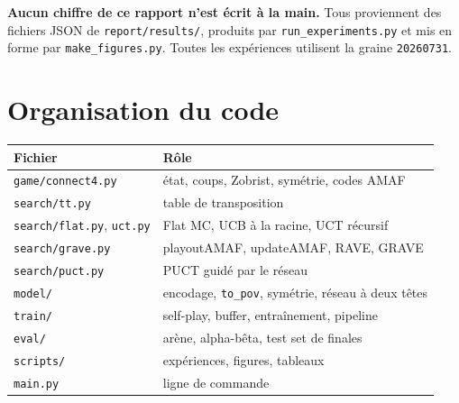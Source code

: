 \documentclass[11pt,a4paper]{article}
\begin{document}
\textbf{Aucun chiffre de ce rapport n'est écrit à la main.} Tous proviennent des
fichiers JSON de \texttt{report/results/}, produits par
\texttt{run\_experiments.py} et mis en forme par \texttt{make\_figures.py}. Toutes
les expériences utilisent la graine \texttt{20260731}.

\section{Organisation du code}

\begin{center}
\footnotesize
\begin{tabular}{@{}ll@{}}
\toprule
Fichier & Rôle \\
\midrule
\texttt{game/connect4.py} & état, coups, Zobrist, symétrie, codes AMAF \\
\texttt{search/tt.py} & table de transposition \\
\texttt{search/flat.py}, \texttt{uct.py} & Flat MC, UCB à la racine, UCT récursif \\
\texttt{search/grave.py} & playoutAMAF, updateAMAF, RAVE, GRAVE \\
\texttt{search/puct.py} & PUCT guidé par le réseau \\
\texttt{model/} & encodage, \texttt{to\_pov}, symétrie, réseau à deux têtes \\
\texttt{train/} & self-play, buffer, entraînement, pipeline \\
\texttt{eval/} & arène, alpha-bêta, test set de finales \\
\texttt{scripts/} & expériences, figures, tableaux \\
\texttt{main.py} & ligne de commande \\
\bottomrule
\end{tabular}
\end{center}
\end{document}

